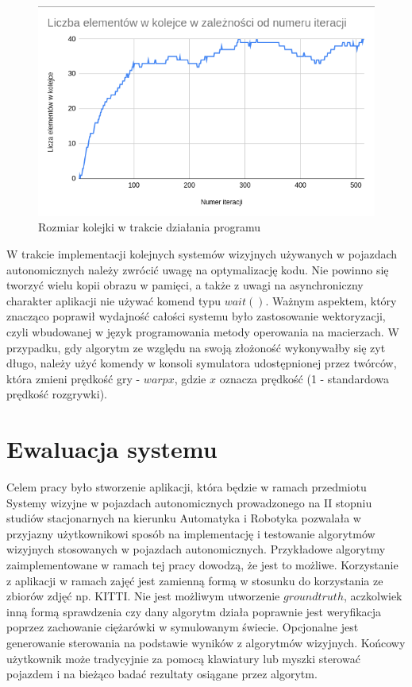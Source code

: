 \begin{figure}
  \centering
  \includegraphics[width=13cm]{img/queue_stats.png}
  \caption{Rozmiar kolejki w trakcie działania programu}
  \label{fig:queue_stats}
\end{figure}

W trakcie implementacji kolejnych systemów wizyjnych używanych w pojazdach autonomicznych należy zwrócić uwagę na optymalizację kodu. Nie powinno się tworzyć wielu kopii obrazu w pamięci, a także z uwagi na asynchroniczny charakter aplikacji nie używać komend typu $wait()$. Ważnym aspektem, który znacząco poprawił wydajność całości systemu było zastosowanie wektoryzacji, czyli wbudowanej w język programowania metody operowania na macierzach. W przypadku, gdy algorytm ze względu na swoją złożoność wykonywałby się zyt długo, należy użyć komendy w konsoli symulatora udostępnionej przez twórców, która zmieni prędkość gry - $warp x$, gdzie $x$ oznacza prędkość (1 - standardowa prędkość rozgrywki).

\section{Ewaluacja systemu}
Celem pracy było stworzenie aplikacji, która będzie w ramach przedmiotu Systemy wizyjne w pojazdach autonomicznych prowadzonego na II stopniu studiów stacjonarnych na kierunku Automatyka i Robotyka pozwalała w przyjazny użytkownikowi sposób na implementację i testowanie algorytmów wizyjnych stosowanych w pojazdach autonomicznych. Przykładowe algorytmy zaimplementowane w ramach tej pracy dowodzą, że jest to możliwe. Korzystanie z aplikacji w ramach zajęć jest zamienną formą w stosunku do korzystania ze zbiorów zdjęć np. KITTI. Nie jest możliwym utworzenie $groundtruth$, aczkolwiek inną formą sprawdzenia czy dany algorytm działa poprawnie jest weryfikacja poprzez zachowanie ciężarówki w symulowanym świecie. Opcjonalne jest generowanie sterowania na podstawie wyników z algorytmów wizyjnych. Końcowy użytkownik może tradycyjnie za pomocą klawiatury lub myszki sterować pojazdem i na bieżąco badać rezultaty osiągane przez algorytm.

